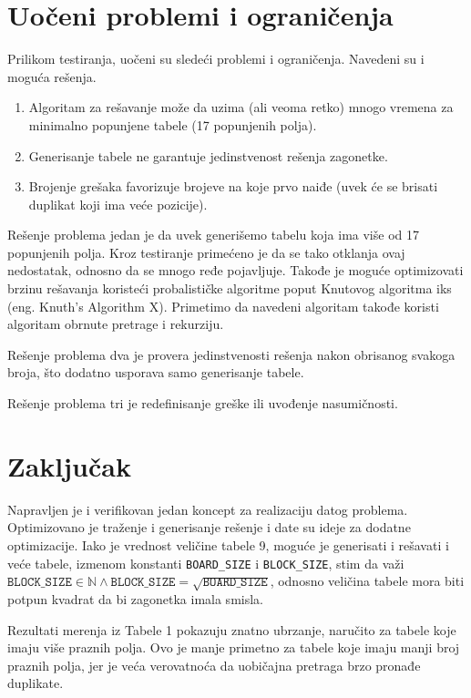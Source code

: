 \documentclass[a4paper]{article}
\begin{document}
    \section{Uočeni problemi i ograničenja}
    Prilikom testiranja, uočeni su sledeći problemi i ograničenja. Navedeni su i moguća rešenja.
    \begin{enumerate}
        \item Algoritam za rešavanje može da uzima (ali veoma retko) mnogo vremena za minimalno popunjene tabele (17 popunjenih polja).
        \item Generisanje tabele ne garantuje jedinstvenost rešenja zagonetke.
        \item Brojenje grešaka favorizuje brojeve na koje prvo naiđe (uvek će se brisati duplikat koji ima veće pozicije).
    \end{enumerate}
    \par Rešenje problema jedan je da uvek generišemo tabelu koja ima više od 17 popunjenih polja. Kroz testiranje primećeno je da se tako otklanja ovaj nedostatak, odnosno da se
    mnogo ređe pojavljuje. Takođe je moguće optimizovati brzinu rešavanja koristeći probalističke algoritme poput Knutovog algoritma iks (eng. Knuth's Algorithm X). Primetimo da navedeni algoritam
    takođe koristi algoritam obrnute pretrage i rekurziju.
    \par Rešenje problema dva je provera jedinstvenosti rešenja nakon obrisanog svakoga broja, što dodatno usporava samo generisanje tabele.
    \par Rešenje problema tri je redefinisanje greške ili uvođenje nasumičnosti.
    \newpage
    \section{Zaključak}
    Napravljen je i verifikovan jedan koncept za realizaciju datog problema. Optimizovano je traženje i generisanje rešenje i date su ideje za 
    dodatne optimizacije. Iako je vrednost veličine tabele 9, moguće je generisati i rešavati i veće tabele, izmenom konstanti \texttt{BOARD\_SIZE} i \texttt{BLOCK\_SIZE}, stim
    da važi $\texttt{BLOCK\_SIZE} \in \mathbb{N} \land \texttt{BLOCK\_SIZE} = \sqrt{\texttt{BOARD\_SIZE}}$, odnosno veličina tabele mora biti potpun kvadrat da bi zagonetka imala smisla.
    \par Rezultati merenja iz Tabele 1 pokazuju znatno ubrzanje, naručito za tabele koje imaju više praznih polja. Ovo je manje primetno za tabele koje imaju 
    manji broj praznih polja, jer je veća verovatnoća da uobičajna pretraga brzo pronađe duplikate. 
    \newpage
\end{document}
